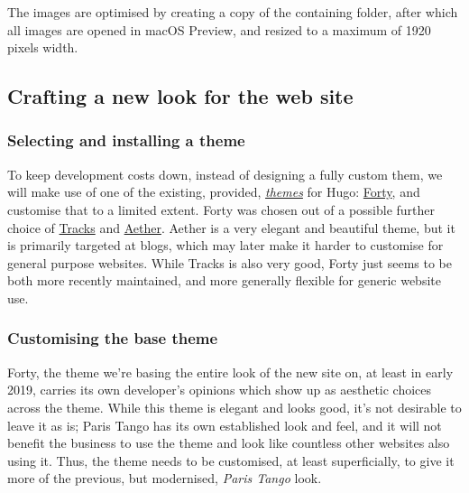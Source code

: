 \documentclass{article}
\begin{document}
The images are optimised by creating a copy of the containing folder, after
which all images are opened in macOS Preview, and resized to a maximum of 1920
pixels width.


\subsection{Crafting a new look for the web site}
\label{sec:org30718be}

\subsubsection{Selecting and installing a theme}
\label{sec:orgfe0b241}
To keep development costs down, instead of designing a fully custom them, we
will make use of one of the existing, provided, \emph{\href{https://themes.gohugo.io/aether/}{themes}} for Hugo: \href{https://themes.gohugo.io/forty/}{Forty}, and customise
that to a limited extent. Forty was chosen out of a possible further choice of
\href{https://themes.gohugo.io/hugo-tracks-theme/}{Tracks} and \href{https://themes.gohugo.io/aether/}{Aether}. Aether is a very elegant and beautiful theme, but it is
primarily targeted at blogs, which may later make it harder to customise for
general purpose websites. While Tracks is also very good, Forty just seems to be
both more recently maintained, and more generally flexible for generic website
use.

\subsubsection{Customising the base theme}
\label{sec:orga0df261}
Forty, the theme we're basing the entire look of the new site on, at least in
early 2019, carries its own developer's opinions which show up as aesthetic
choices across the theme. While this theme is elegant and looks good, it's not
desirable to leave it as is; Paris Tango has its own established look and feel,
and it will not benefit the business to use the theme and look like countless
other websites also using it. Thus, the theme needs to be customised, at least
superficially, to give it more of the previous, but modernised, \emph{Paris Tango}
look.
\end{document}
